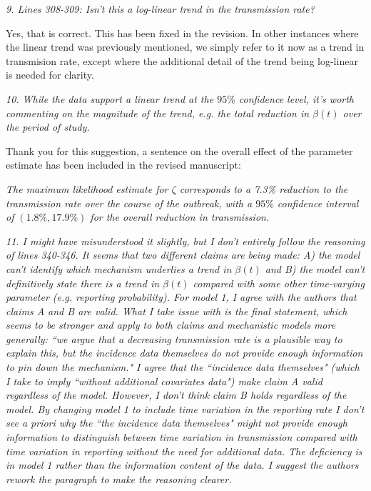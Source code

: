 \documentclass[11pt]{article}
\newcommand\transmissionTrend{\zeta}
\newcommand\report[1]{{\color{mygreen} \vspace{1mm}\hspace{0.25in}\parbox{6in}{\em #1}}}
\newcommand\article[1]{{\color{blue} \vspace{1mm}\hspace{0.25in}\parbox{6in}{\em #1}}}
\begin{document}
\report{9.
  Lines 308-309: Isn't this a log-linear trend in the transmission rate?
}

Yes, that is correct. This has been fixed in the revision. In other instances where the linear trend was previously mentioned, we simply refer to it now as a trend in transmision rate, except where the additional detail of the trend being log-linear is needed for clarity.

\report{10.
  While the data support a linear trend at the $95\%$ confidence level, it's worth commenting on the magnitude of the trend, e.g. the total reduction in $\beta(t)$ over the period of study.
}

Thank you for this suggestion, a sentence on the overall effect of the parameter estimate has been included in the revised manuscript:

\article{The maximum likelihood estimate for $\transmissionTrend$ corresponds to a 7.3\% reduction to the transmission rate over the course of the outbreak, with a $95\%$ confidence interval of $(1.8\%, 17.9\%)$ for the overall reduction in transmission.}

\report{11.
  I might have misunderstood it slightly, but I don't entirely follow the reasoning of lines 340-346. It seems that two different claims are being made: A) the model can’t identify which mechanism underlies a trend in $\beta(t)$ and B) the model can't definitively state there is a trend in $\beta(t)$ compared with some other time-varying parameter (e.g. reporting probability). For model 1, I agree with the authors that claims A and B are valid. What I take issue with is the final statement, which seems to be stronger and apply to both claims and mechanistic models more generally: ``we argue that a decreasing transmission rate is a plausible way to explain this, but the incidence data themselves do not provide enough information to pin down the mechanism." I agree that the ``incidence data themselves" (which I take to imply ``without additional covariates data") make claim A valid regardless of the model. However, I don’t think claim B holds regardless of the model. By changing model 1 to include time variation in the reporting rate I don't see \emph{a priori} why the ``the incidence data themselves" might not provide enough information to distinguish between time variation in transmission compared with time variation in reporting without the need for additional data. The deficiency is in model 1 rather than the information content of the data. I suggest the authors rework the paragraph to make the reasoning clearer.
}
\end{document}

